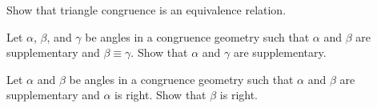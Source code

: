 \Exercises%

\begin{exercise}
Show that triangle congruence is an equivalence relation.
\end{exercise}

\begin{exercise}
Let \(\alpha\), \(\beta\), and \(\gamma\) be angles in a congruence geometry such that \(\alpha\) and \(\beta\) are supplementary and \(\beta \equiv \gamma\).
Show that \(\alpha\) and \(\gamma\) are supplementary.
\end{exercise}

\begin{exercise}
Let \(\alpha\) and \(\beta\) be angles in a congruence geometry such that \(\alpha\) and \(\beta\) are supplementary and \(\alpha\) is right.
Show that \(\beta\) is right.
\end{exercise}
